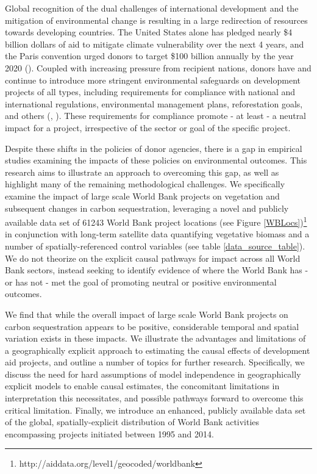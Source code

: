 \documentclass{article}\usepackage[]{graphicx}\usepackage[]{color}
\newenvironment{knitrout}{}{}  %
\begin{document}
\begin{knitrout}
Global recognition of the dual challenges of international development and the mitigation of environmental change is resulting in a large redirection of resources towards developing countries. 
The United States alone has pledged nearly \$4 billion dollars of aid to mitigate climate vulnerability over the next 4 years, and the Paris convention urged donors to target \$100 billion annually by the year 2020 (\cite{royal_united_2015}). 
Coupled with increasing pressure from recipient nations, donors have and continue to introduce more stringent environmental safeguards on development projects of all types, including requirements for compliance with national and international regulations, environmental management plans, reforestation goals, and others (\cite{nielson_delegation_2003}, \cite{gutner_explaining_2005}).
These requirements for compliance promote - at least - a neutral impact for a project, irrespective of the sector or goal of the specific project.

\par

Despite these shifts in the policies of donor agencies, there is a gap in empirical studies examining the impacts of these policies on environmental outcomes.  
This research aims to illustrate an approach to overcoming this gap, as well as highlight many of the remaining methodological challenges.
We specifically examine the impact of large scale World Bank projects on vegetation and subsequent changes in carbon sequestration, leveraging a novel and publicly available data set of 61243 World Bank project locations (see Figure \ref{WBLocs})\footnote{http://aiddata.org/level1/geocoded/worldbank} in conjunction with long-term satellite data quantifying vegetative biomass and a number of spatially-referenced control variables (see table \ref{data_source_table}).
We do not theorize on the explicit causal pathways for impact across all World Bank sectors, instead seeking to identify evidence of where the World Bank has - or has not - met the goal of promoting neutral or positive environmental outcomes.


\par

We find that while the overall impact of large scale World Bank projects on carbon sequestration appears to be positive, considerable temporal and spatial variation exists in these impacts.
We illustrate the advantages and limitations of a geographically explicit approach to estimating the causal effects of development aid projects, and outline a number of topics for further research.
Specifically, we discuss the need for hard assumptions of model independence in geographically explicit models to enable causal estimates, the concomitant limitations in interpretation this necessitates, and possible pathways forward to overcome this critical limitation.
Finally, we introduce an enhanced, publicly available data set of the global, spatially-explicit distribution of World Bank activities encompassing projects initiated between 1995 and 2014.

\end{knitrout}
\end{document}
